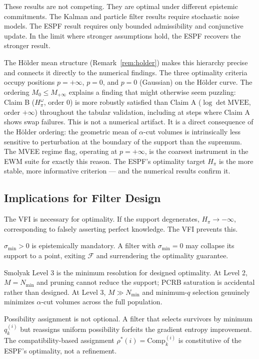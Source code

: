 \documentclass[12pt]{article}
\begin{document}
These results are not competing. They are optimal under different epistemic commitments. The
Kalman and particle filter results require stochastic noise models. The ESPF result requires
only bounded admissibility and conjunctive update. In the limit where stronger assumptions hold,
the ESPF recovers the stronger result.

The H\"{o}lder mean structure (Remark~\ref{rem:holder}) makes this hierarchy precise and connects it directly to the numerical findings. The three optimality criteria occupy positions $p = +\infty$, $p = 0$, and $p = 0$ (Gaussian) on the H\"{o}lder curve. The ordering $M_0 \leq M_{+\infty}$ explains a finding that might otherwise seem puzzling: Claim B ($H^\omega_\pi$, order 0) is more robustly satisfied than Claim A ($\log\det\mathrm{MVEE}$, order $+\infty$) throughout the tabular validation, including at steps where Claim A shows swap failures. This is not a numerical artifact. It is a direct consequence of the H\"{o}lder ordering: the geometric mean of $\alpha$-cut volumes is intrinsically less sensitive to perturbation at the boundary of the support than the supremum. The MVEE regime flag, operating at $p = +\infty$, is the coarsest instrument in the EWM suite for exactly this reason. The ESPF's optimality target $H_\pi$ is the more stable, more informative criterion --- and the numerical results confirm it.

\subsection{Implications for Filter Design}

The VFI is necessary for optimality. If the support degenerates, $H_\pi \to -\infty$, corresponding to falsely asserting perfect knowledge. The VFI prevents this.

$\sigma_{\min} > 0$ is epistemically mandatory. A filter with $\sigma_{\min} = 0$ may collapse its support to a point, exiting $\mathcal{F}$ and surrendering the optimality guarantee.

Smolyak Level 3 is the minimum resolution for designed optimality. At Level 2, $M = N_{\min}$ and pruning cannot reduce the support; PCRB saturation is accidental rather than designed. At Level 3, $M \gg N_{\min}$ and minimum-$q$ selection genuinely minimizes $\alpha$-cut volumes across the full population.

Possibility assignment is not optional. A filter that selects survivors by minimum $q^{(i)}_k$ but reassigns uniform possibility forfeits the gradient entropy improvement. The compatibility-based assignment $\rho^*(i) = \mathrm{Comp}^{(i)}_k$ is constitutive of the ESPF's optimality, not a refinement.
\end{document}

